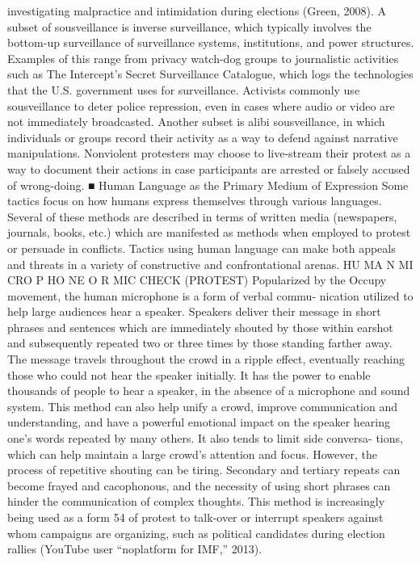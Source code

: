 \documentclass[twoside,a4paper,12pt,fleqn,openany]{extbook}
\begin{document}
investigating malpractice and intimidation during elections (Green, 2008). A subset of
sousveillance is inverse surveillance, which typically involves the bottom-up surveillance of
surveillance systems, institutions, and power structures. Examples of this range from privacy
watch-dog groups to journalistic activities such as The Intercept’s Secret Surveillance
Catalogue, which logs the technologies that the U.S. government uses for surveillance.
Activists commonly use sousveillance to deter police repression, even in cases where audio
or video are not immediately broadcasted. Another subset is alibi sousveillance, in which
individuals or groups record their activity as a way to defend against narrative manipulations.
Nonviolent protesters may choose to live-stream their protest as a way to document their
actions in case participants are arrested or falsely accused of wrong-doing.
■ Human Language as the Primary Medium of Expression
Some tactics focus on how humans express themselves through various languages. Several
of these methods are described in terms of written media (newspapers, journals, books, etc.)
which are manifested as methods when employed to protest or persuade in conflicts. Tactics
using human language can make both appeals and threats in a variety of constructive and
confrontational arenas.
HU MA N MI CRO P HO NE O R MIC CHECK (PROTEST)
Popularized by the Occupy movement, the human microphone is a form of verbal commu-
nication utilized to help large audiences hear a speaker. Speakers deliver their message in
short phrases and sentences which are immediately shouted by those within earshot and
subsequently repeated two or three times by those standing farther away. The message
travels throughout the crowd in a ripple effect, eventually reaching those who could not hear
the speaker initially. It has the power to enable thousands of people to hear a speaker, in the
absence of a microphone and sound system. This method can also help unify a crowd,
improve communication and understanding, and have a powerful emotional impact on the
speaker hearing one’s words repeated by many others. It also tends to limit side conversa-
tions, which can help maintain a large crowd’s attention and focus.
However, the process of repetitive shouting can be tiring. Secondary and tertiary repeats
can become frayed and cacophonous, and the necessity of using short phrases can hinder
the communication of complex thoughts. This method is increasingly being used as a form
54
of protest to talk-over or interrupt speakers against whom campaigns are organizing, such
as political candidates during election rallies (YouTube user “noplatform for IMF,” 2013).
\end{document}
